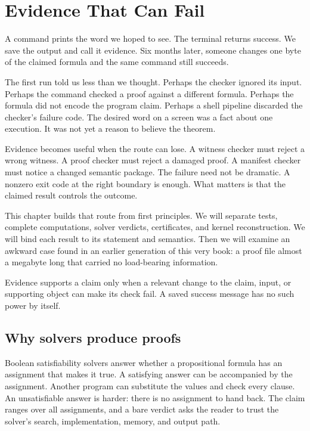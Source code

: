 \chapter{Evidence That Can Fail}
\label{ch:evidence}

A command prints the word we hoped to see. The terminal returns success. We
save the output and call it evidence. Six months later, someone changes one
byte of the claimed formula and the same command still succeeds.

The first run told us less than we thought. Perhaps the checker ignored its
input. Perhaps the command checked a proof against a different formula.
Perhaps the formula did not encode the program claim. Perhaps a shell pipeline
discarded the checker's failure code. The desired word on a screen was a fact
about one execution. It was not yet a reason to believe the theorem.

Evidence becomes useful when the route can lose. A witness checker must reject
a wrong witness. A proof checker must reject a damaged proof. A manifest
checker must notice a changed semantic package. The failure need not be
dramatic. A nonzero exit code at the right boundary is enough. What matters is
that the claimed result controls the outcome.

This chapter builds that route from first principles. We will separate tests,
complete computations, solver verdicts, certificates, and kernel
reconstruction. We will bind each result to its statement and semantics. Then
we will examine an awkward case found in an earlier generation of this very
book: a proof file almost a megabyte long that carried no load-bearing
information.

\begin{keyidea}[title={Evidence must discriminate}]
Evidence supports a claim only when a relevant change to the claim, input, or
supporting object can make its check fail. A saved success message has no such
power by itself.
\end{keyidea}

\section{Why solvers produce proofs}

Boolean satisfiability solvers answer whether a propositional formula has an
assignment that makes it true. A satisfying answer can be accompanied by the
assignment. Another program can substitute the values and check every clause.
An unsatisfiable answer is harder: there is no assignment to hand back. The
claim ranges over all assignments, and a bare verdict asks the reader to trust
the solver's search, implementation, memory, and output path.


